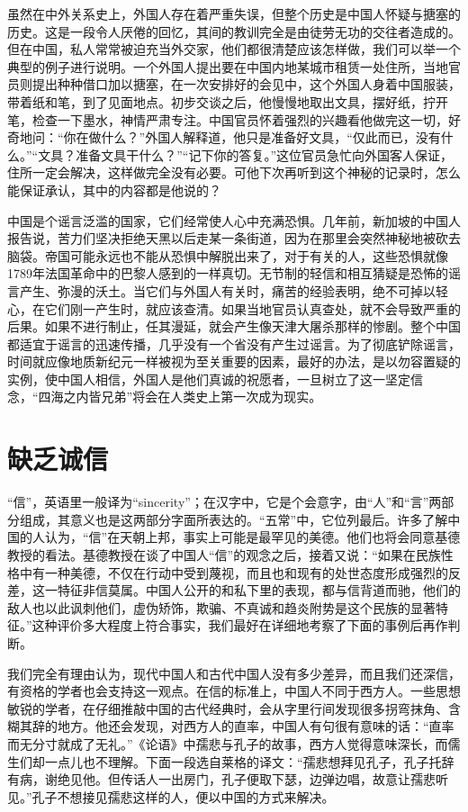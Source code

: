 \documentclass[12pt,oneside]{book}
\begin{document}
\begin{common-format}
虽然在中外关系史上，外国人存在着严重失误，但整个历史是中国人怀疑与搪塞的历史。这是一段令人厌倦的回忆，其间的教训完全是由徒劳无功的交往者造成的。但在中国，私人常常被迫充当外交家，他们都很清楚应该怎样做，我们可以举一个典型的例子进行说明。一个外国人提出要在中国内地某城市租赁一处住所，当地官员则提出种种借口加以搪塞，在一次安排好的会见中，这个外国人身着中国服装，带着纸和笔，到了见面地点。初步交谈之后，他慢慢地取出文具，摆好纸，拧开笔，检查一下墨水，神情严肃专注。中国官员怀着强烈的兴趣看他做完这一切，好奇地问：“你在做什么？”外国人解释道，他只是准备好文具，“仅此而已，没有什么。”“文具？准备文具干什么？”“记下你的答复。”这位官员急忙向外国客人保证，住所一定会解决，这样做完全没有必要。可他下次再听到这个神秘的记录时，怎么能保证承认，其中的内容都是他说的？ 

中国是个谣言泛滥的国家，它们经常使人心中充满恐惧。几年前，新加坡的中国人报告说，苦力们坚决拒绝天黑以后走某一条街道，因为在那里会突然神秘地被砍去脑袋。帝国可能永远也不能从恐惧中解脱出来了，对于有关的人，这些恐惧就像1789年法国革命中的巴黎人感到的一样真切。无节制的轻信和相互猜疑是恐怖的谣言产生、弥漫的沃土。当它们与外国人有关时，痛苦的经验表明，绝不可掉以轻心，在它们刚一产生时，就应该查清。如果当地官员认真查处，就不会导致严重的后果。如果不进行制止，任其漫延，就会产生像天津大屠杀那样的惨剧。整个中国都适宜于谣言的迅速传播，几乎没有一个省没有产生过谣言。为了彻底铲除谣言，时间就应像地质新纪元一样被视为至关重要的因素，最好的办法，是以勿容置疑的实例，使中国人相信，外国人是他们真诚的祝愿者，一旦树立了这一坚定信念，“四海之内皆兄弟”将会在人类史上第一次成为现实。


\chapter{缺乏诚信}
“信”，英语里一般译为“sincerity”；在汉字中，它是个会意字，由“人”和“言”两部分组成，其意义也是这两部分字面所表达的。“五常”中，它位列最后。许多了解中国的人认为，“信”在天朝上邦，事实上可能是最罕见的美德。他们也将会同意基德教授的看法。基德教授在谈了中国人“信”的观念之后，接着又说：“如果在民族性格中有一种美德，不仅在行动中受到蔑视，而且也和现有的处世态度形成强烈的反差，这一特征非信莫属。中国人公开的和私下里的表现，都与信背道而驰，他们的敌人也以此讽刺他们，虚伪矫饰，欺骗、不真诚和趋炎附势是这个民族的显著特征。”这种评价多大程度上符合事实，我们最好在详细地考察了下面的事例后再作判断。 

我们完全有理由认为，现代中国人和古代中国人没有多少差异，而且我们还深信，有资格的学者也会支持这一观点。在信的标准上，中国人不同于西方人。一些思想敏锐的学者，在仔细推敲中国的古代经典时，会从字里行间发现很多拐弯抹角、含糊其辞的地方。他还会发现，对西方人的直率，中国人有句很有意味的话：“直率而无分寸就成了无礼。”《论语》中孺悲与孔子的故事，西方人觉得意味深长，而儒生们却一点儿也不理解。下面一段选自莱格的译文：“孺悲想拜见孔子，孔子托辞有病，谢绝见他。但传话人一出房门，孔子便取下瑟，边弹边唱，故意让孺悲听见。”孔子不想接见孺悲这样的人，便以中国的方式来解决。 


\end{common-format}
\end{document}

